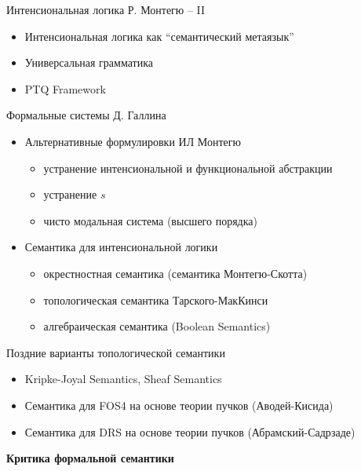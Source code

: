 \documentclass{beamer}
\begin{document}
\begin{frame}{Интенсиональная логика Р. Монтегю -- II}
\begin{itemize}
    \item Интенсиональная логика как ``семантический метаязык''
    \medskip
    \item Универсальная грамматика
    \medskip 
    \item PTQ Framework
\end{itemize}
\end{frame}

\begin{frame}{Формальные системы Д. Галлина}
\begin{itemize}
    \item Альтернативные формулировки ИЛ Монтегю
    \medskip
        \begin{itemize}
            \item устранение интенсиональной и функциональной абстракции
            \item устранение $s$
            \item чисто модальная система (высшего порядка)
        \end{itemize}            
    \medskip
    \item Семантика для интенсиональной логики
    \medskip
        \begin{itemize}
            \item окрестностная семантика (семантика Монтегю-Скотта)
            \item топологическая семантика Тарского-МакКинси
            \item алгебраическая семантика (Boolean Semantics)
        \end{itemize}            
\end{itemize}
\end{frame}

\begin{frame}{Поздние варианты топологической семантики}
\begin{itemize}
    \item Kripke-Joyal Semantics, Sheaf Semantics
    \medskip
    \item Семантика для FOS4 на основе теории пучков (Аводей-Кисида)
    \medskip
    \item Семантика для DRS на основе теории пучков (Абрамский-Садрзаде)
\end{itemize}
\end{frame}

\begin{frame}{}
\begin{center}
	\textbf{Критика формальной семантики}
\end{center}
\end{frame}
\end{document}

